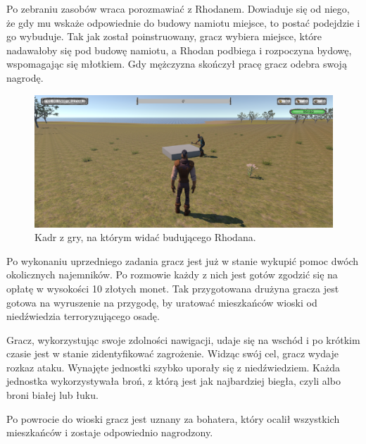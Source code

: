 Po zebraniu zasobów wraca porozmawiać z Rhodanem. Dowiaduje się od niego, że gdy mu wskaże odpowiednie do budowy namiotu
miejsce, to postać podejdzie i go wybuduje. Tak jak został poinstruowany, gracz wybiera miejsce, które nadawałoby się
pod budowę namiotu, a Rhodan podbiega i rozpoczyna bydowę, wspomagając się młotkiem. Gdy mężczyzna skończył pracę gracz
odebra swoją nagrodę.

\begin{figure}[h!]
    \centering
    \includegraphics[width=1\textwidth]{images/rozgrywka/rhodan9.png}
    \caption{Kadr z gry, na którym widać budującego Rhodana.}
\end{figure}

Po wykonaniu uprzedniego zadania gracz jest już w stanie wykupić pomoc dwóch okolicznych
najemników. Po rozmowie każdy z nich jest gotów zgodzić się na opłatę w wysokości 10 złotych monet.
Tak przygotowana drużyna gracza jest gotowa na wyruszenie na przygodę, by uratować
mieszkańców wioski od niedźwiedzia terroryzującego osadę.

Gracz, wykorzystując swoje zdolności nawigacji, udaje się na wschód i po krótkim czasie jest w stanie zidentyfikować zagrożenie.
Widząc swój cel, gracz wydaje rozkaz ataku. Wynajęte jednostki szybko uporały się z niedźwiedziem. Każda jednostka wykorzystywała
broń, z którą jest jak najbardziej biegła, czyli albo broni białej lub łuku.

Po powrocie do wioski gracz jest uznany za bohatera, który ocalił wszystkich mieszkańców i zostaje odpowiednio nagrodzony.

